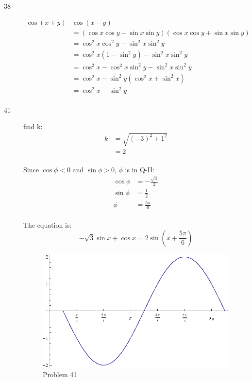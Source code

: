 \documentclass{exam}
\begin{document}
\begin{description}
      \item[38] 
        \begin{align*}
          \cos(x + y) & \cos(x - y)  \\
                      & = ( \cos x \cos y - \sin x \sin y )( \cos x \cos y + \sin x \sin y ) \\
                      & = \cos^2 x \cos^2 y - \sin^2 x \sin^2 y \\
                      & = \cos^2 x \left( 1 - \sin^2 y \right) - \sin^2 x \sin^2 y \\
                      & = \cos^2 x - \cos^2 x \sin^2 y  - \sin^2 x \sin^2 y \\
                      & = \cos^2 x - \sin^2 y \left( \cos^2 x + \sin^2 x \right) \\
                      & = \cos^2 x - \sin^2 y \\
        \end{align*}

      \pagebreak

      \item[41] 
        find k:
        \begin{align*}
          k & = \sqrt{(-3)^2 + 1^2} \\
            & = 2 \\
        \end{align*}

        Since $\cos \phi < 0$ and $\sin \phi > 0$, $\phi$ is in Q-II:
        \begin{align*}
          \cos \phi & = - \frac{\sqrt{3}}{2} \\
          \sin \phi & = \frac{1}{2} \\
          \phi      & = \frac{5 \pi}{6} \\
        \end{align*}

        The equation is:
        \[
          - \sqrt{3} \sin x + \cos x = \boxed{ 2 \sin \left( x + \frac{5 \pi}{6} \right) } 
        \]

        \begin{figure}[H]
          \centering
          \includegraphics[scale=0.8]{problem41.eps}
          \caption{Problem 41}
        \end{figure}


\end{description}
\end{document}
